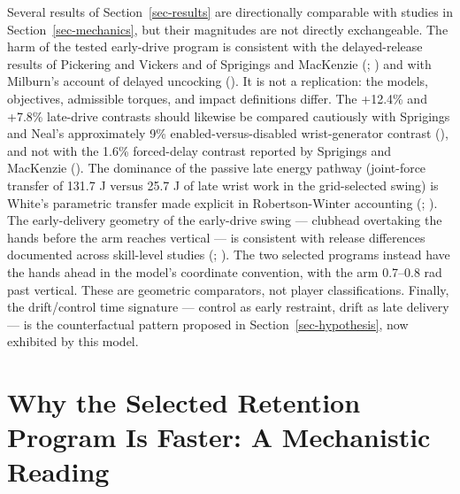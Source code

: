 \documentclass[
  letterpaper,
]{report}
\begin{document}
Several results of Section~\ref{sec-results} are directionally
comparable with studies in Section~\ref{sec-mechanics}, but their
magnitudes are not directly exchangeable. The harm of the tested
early-drive program is consistent with the delayed-release results of
Pickering and Vickers and of Sprigings and MacKenzie
(;
) and with
Milburn's account of delayed uncocking
(). It is not a replication: the
models, objectives, admissible torques, and impact definitions differ.
The +12.4\% and +7.8\% late-drive contrasts should likewise be compared
cautiously with Sprigings and Neal's approximately 9\%
enabled-versus-disabled wrist-generator contrast
(), and not with
the 1.6\% forced-delay contrast reported by Sprigings and MacKenzie
(). The
dominance of the passive late energy pathway (joint-force transfer of
131.7 J versus 25.7 J of late wrist work in the grid-selected swing) is
White's parametric transfer made explicit in Robertson-Winter accounting
(;
). The
early-delivery geometry of the early-drive swing --- clubhead overtaking
the hands before the arm reaches vertical --- is consistent with release
differences documented across skill-level studies
(;
). The two selected programs
instead have the hands ahead in the model's coordinate convention, with
the arm 0.7--0.8 rad past vertical. These are geometric comparators, not
player classifications. Finally, the drift/control time signature ---
control as early restraint, drift as late delivery --- is the
counterfactual pattern proposed in Section~\ref{sec-hypothesis}, now
exhibited by this model.

\section{Why the Selected Retention Program Is Faster: A Mechanistic
Reading}\label{sec-discussion-mechanism}
\end{document}
